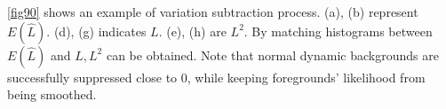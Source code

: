 \documentclass[a4paper,twocolumn, 10pt]{article}
\begin{document}
\ref{fig90} shows an example of variation subtraction process. (a), (b) represent \begin{math} E(\hat{L}) \end{math}.
(d), (g) indicates \begin{math} L \end{math}. (e), (h) are \begin{math} L^2 \end{math}.
By matching histograms between \begin{math} E(\hat{L}) \end{math} and \begin{math} L, L^2 \end{math} can be obtained.
Note that normal dynamic backgrounds are successfully suppressed close to 0, while keeping foregrounds' likelihood from being smoothed.










\end{document}
